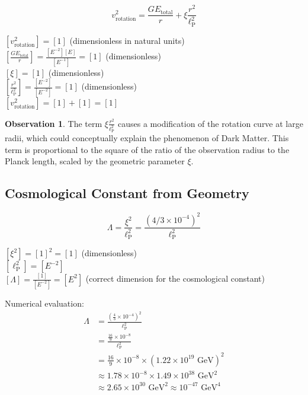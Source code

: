 \documentclass[12pt,a4paper]{article}
\newcommand{\lp}{\ell_{\text{P}}}
\theoremstyle{definition}
\newtheorem{beobachtung}{Observation}
\begin{document}
	\begin{equation}
		v_{\text{rotation}}^2 = \frac{GE_{\text{total}}}{r} + \xi \frac{r^2}{\lp^2}
	\end{equation}
	
	\begin{einheitencheck}
		$[v_{\text{rotation}}^2] = [1]$ (dimensionless in natural units)\\
		$[\frac{GE_{\text{total}}}{r}] = \frac{[E^{-2}][E]}{[E^{-1}]} = [1]$ (dimensionless)\\
		$[\xi] = [1]$ (dimensionless)\\
		$[\frac{r^2}{\lp^2}] = \frac{[E^{-2}]}{[E^{-2}]} = [1]$ (dimensionless)\\
		$[v_{\text{rotation}}^2] = [1] + [1] = [1]$ \checkmark
	\end{einheitencheck}
	
	\begin{beobachtung}
		The term $\xi \frac{r^2}{\lp^2}$ causes a modification of the rotation curve at large radii, which could conceptually explain the phenomenon of Dark Matter. This term is proportional to the square of the ratio of the observation radius to the Planck length, scaled by the geometric parameter $\xi$.
	\end{beobachtung}
	
	\subsection{Cosmological Constant from Geometry}
	
	\begin{equation}
		\Lambda = \frac{\xi^2}{\lp^2} = \frac{(4/3 \times 10^{-4})^2}{\lp^2}
	\end{equation}
	
	\begin{einheitencheck}
		$[\xi^2] = [1]^2 = [1]$ (dimensionless)\\
		$[\lp^2] = [E^{-2}]$\\
		$[\Lambda] = \frac{[1]}{[E^{-2}]} = [E^2]$ (correct dimension for the cosmological constant) \checkmark
	\end{einheitencheck}
	
	\begin{verhaltnis}
		Numerical evaluation:
		\begin{align}
			\Lambda &= \frac{\left(\frac{4}{3} \times 10^{-4}\right)^2}{\lp^2}\\
			&= \frac{\frac{16}{9} \times 10^{-8}}{\lp^2}\\
			&= \frac{16}{9} \times 10^{-8} \times (1.22 \times 10^{19} \text{ GeV})^2\\
			&\approx 1.78 \times 10^{-8} \times 1.49 \times 10^{38} \text{ GeV}^2\\
			&\approx 2.65 \times 10^{30} \text{ GeV}^2 \approx 10^{-47} \text{ GeV}^4
		\end{align}
	\end{verhaltnis}
	
\end{document}
